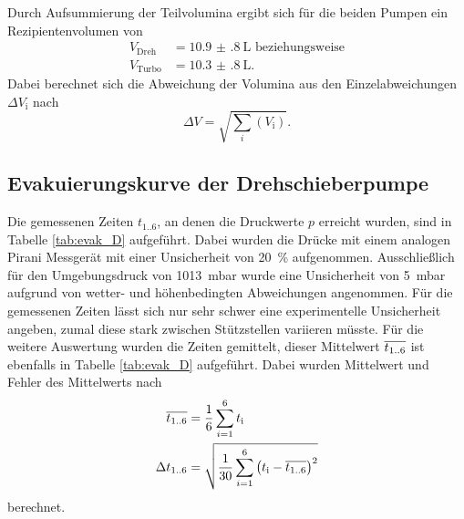 Durch Aufsummierung der Teilvolumina ergibt sich für die beiden Pumpen ein Rezipientenvolumen von
\begin{align*}
  V_\text{Dreh} &= \SI{10.9(8)}{\liter} \text{ beziehungsweise}\\
  V_\text{Turbo} &= \SI{10.3(8)}{\liter}.
\end{align*}
Dabei berechnet sich die Abweichung der Volumina aus den
Einzelabweichungen $\Delta V_\text{i}$ nach
\begin{equation*}
  \Delta V = \sqrt{\sum_i \left(V_\text{i}\right)}.
\end{equation*}


\subsection{Evakuierungskurve der Drehschieberpumpe}
\label{sec:AuswEvaD}

Die gemessenen Zeiten $t_\text{1..6}$, an denen die Druckwerte $p$ erreicht
wurden, sind in Tabelle \ref{tab:evak_D} aufgeführt. Dabei wurden die Drücke
mit einem analogen Pirani Messgerät mit einer
Unsicherheit von \SI{20}{\percent} aufgenommen.
Ausschließlich für den Umgebungsdruck von \SI{1013}{\milli\bar} wurde eine
Unsicherheit von \SI{5}{\milli\bar} aufgrund von wetter- und höhenbedingten
Abweichungen angenommen.
Für die gemessenen Zeiten lässt
sich nur sehr schwer eine experimentelle Unsicherheit angeben, zumal diese stark
zwischen Stützstellen variieren müsste. Für die weitere Auswertung wurden die
Zeiten gemittelt, dieser Mittelwert $\overline{t_\text{1..6}}$ ist ebenfalls in
Tabelle \ref{tab:evak_D} aufgeführt.
Dabei wurden Mittelwert und Fehler des Mittelwerts nach
\begin{align*}
  \overline{t_\text{1..6}} &= \frac{1}{6} \sum_{i = 1}^6 t_\text{i} \\
  \Delta t_\text{1..6} &=
  \sqrt{\frac{1}{30} \sum_{i = 1}^6 \left(t_\text{i} - \overline{t_\text{1..6}}\right)^2}
\end{align*}
berechnet.



